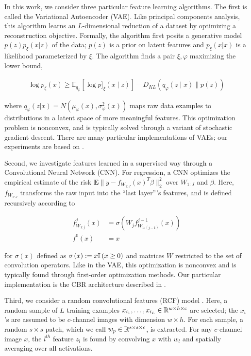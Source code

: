 In this work, we consider three particular feature learning algorithms. The
first is called the Variational Autoencoder (VAE). Like principal components
analysis, this algorithm learns an $L$-dimensional reduction of a dataset by
optimizing a reconstruction objective. Formally, the algorithm first posits a
generative model $p\left(z\right)p_{\xi}\left(x \vert z\right)$ of the data;
$p\left(z\right)$ is a prior on latent features and $p_{\xi}\left(x \vert
x\right)$ is a likelihood parameterized by $\xi$. The algorithm finds a pair
$\xi, \varphi$ maximizing the lower bound,

\begin{align*}
\log p_{\xi}\left(x\right) \geq  \mathbb{E}_{q_{\varphi}}\left[\log p]_{\xi}(x \mid z)\right]-D_{KL}\left(q_{\varphi}(z \mid x) \| p(z)\right)
\end{align*}

where $q_{\varphi}\left(z \vert x\right) = N\left(\mu_{\varphi}\left(x\right),
\sigma^{2}_{\varphi}\left(x\right)\right)$ maps raw data examples to
distributions in a latent space of more meaningful features. This optimization
problem is nonconvex, and is typically solved through a variant of stochastic
gradient descent. There are many particular implementations of VAEs; our
experiments are based on \citep{van2017neural}.

Second, we investigate features learned in a supervised way through a
Convolutional Neural Network (CNN). For regression, a CNN optimizes the
empirical estimate of the risk $\mathbf{E}\|y -
f_{W_{1:J}}\left(x\right)^{T}\beta\|_{2}^{2}$ over $W_{1:J}$ and $\beta$. Here,
$f_{W_{1:J}}$ transforms the raw input into the ``last layer''’s features, and
is defined recursively according to

\begin{align*}
f^{j}_{W_{1:j}}\left(x\right) &= \sigma\left(W_{j}f^{j - 1}_{W_{1:(j - 1)}}\left(x\right)\right)\\
f^{0}\left(x\right) &= x
\end{align*}

for $\sigma\left(x\right)$ defined as $\sigma\left(x\right) := x \mathbb{I}\left({x \geq
  0}\right)$ and matrices $W$ restricted to the set of convolution operators. Like in
the VAE, this optimization is nonconvex and is typically found through
first-order optimization methods. Our particular implementation is the CBR
architecture described in \citep{raghu2017svcca}.

Third, we consider a random convolutional features (RCF) model
\citep{rahimi2008weighted}. Here, a random sample of $L$ training examples
$x_{i_1}, \dots, x_{i_L} \in \mathbb{R}^{w \times h \times c}$ are selected; the
$x_{i}$'s are assumed to be $c$-channel images with dimension $w\times h$. For
each sample, a random $s \times s$ patch, which we call $w_{p} \in \mathbb{R}^{s
  \times s \times c}$, is extracted. For any $c$-channel image $x$, the $l^{th}$
feature $z_{l}$ is found by convolving $x$ with $w_{l}$ and spatially averaging
over all activations.

